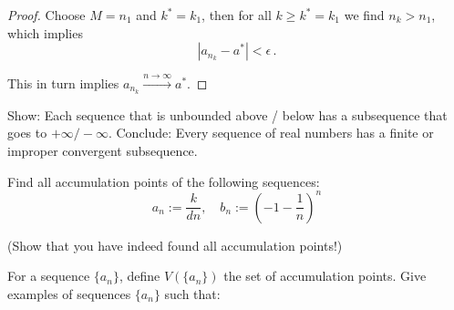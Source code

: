 \documentclass[week=4]{homework}
\begin{document}
\begin{questions}
\begin{proof}
        	Choose $M = n_1$ and $k^* = k_1$, then for all $k \geq k^* = k_1$ we find $n_k > n_1$, which implies
        	\[
	        	|a_{n_k} - a^*| < \epsilon\,.
        	\]
        	
        	This in turn implies $a_{n_k} \xrightarrow{n\to\infty} a^*$.
        \end{proof}
        
        \question 
        Show: Each sequence that is unbounded above / below has a subsequence that goes to $+ \infty / - \infty$. Conclude: Every sequence of real numbers has a finite or improper convergent subsequence. 
        
        \question
        Find all accumulation points of the following sequences:
        \[
	        a_n := \frac{k}{dn}, \quad b_n := \left(-1-\frac{1}{n}\right)^n
        \]
        
        (Show that you have indeed found all accumulation points!)
        
        \question
        For a sequence $\{a_n \} $, define $V(\{a_n \})$ the set of accumulation points. Give examples of sequences $\{a_n \}$ such that:
        
     \end{questions}
\end{document}
